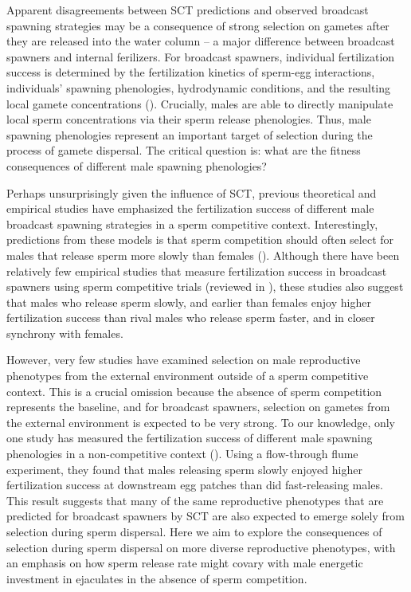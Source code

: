 \documentclass{article}
\begin{document}
Apparent disagreements between SCT predictions and observed broadcast spawning strategies may be a consequence of strong selection on gametes after they are released into the water column -- a major difference between broadcast spawners and internal ferilizers. For broadcast spawners, individual fertilization success is determined by the fertilization kinetics of sperm-egg interactions, individuals' spawning phenologies, hydrodynamic conditions, and the resulting local gamete concentrations (\citealt{DennyShib1989, Levitan1991, Levitan2002, Marshall2002, Levitan2004}). Crucially, males are able to directly manipulate local sperm concentrations via their sperm release phenologies. Thus, male spawning phenologies represent an important target of selection during the process of gamete dispersal. The critical question is: what are the fitness consequences of different male spawning phenologies? 

Perhaps unsurprisingly given the influence of SCT, previous theoretical and empirical studies have emphasized the fertilization success of different male broadcast spawning strategies in a sperm competitive context. Interestingly, predictions from these models is that sperm competition should often select for males that release sperm more slowly than females (\citealt{BodeMarshall2007, Olito2015, Olito2017}). Although there have been relatively few empirical studies that measure fertilization success in broadcast spawners using sperm competitive trials (reviewed in \citealt{LotterhosLevitan2011}), these studies also suggest that males who release sperm slowly, and earlier than females enjoy higher fertilization success than rival males who release sperm faster, and in closer synchrony with females. 

However, very few studies have examined selection on male reproductive phenotypes from the external environment outside of a sperm competitive context. This is a crucial omission because the absence of sperm competition represents the baseline, and for broadcast spawners, selection on gametes from the external environment is expected to be very strong. To our knowledge, only one study has measured the fertilization success of different male spawning phenologies in a non-competitive context (\citealt{BodeMarshall2007}). Using a flow-through flume experiment, they found that males releasing sperm slowly enjoyed higher fertilization success at downstream egg patches than did fast-releasing males. This result suggests that many of the same reproductive phenotypes that are predicted for broadcast spawners by SCT are also expected to emerge solely from selection during sperm dispersal. Here we aim to explore the consequences of selection during sperm dispersal on more diverse reproductive phenotypes, with an emphasis on how sperm release rate might covary with male energetic investment in ejaculates in the absence of sperm competition. 
\end{document}
